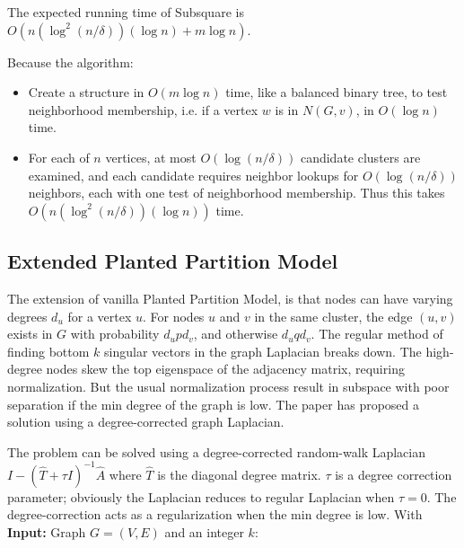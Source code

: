 {	\begin{theorem}
		The expected running time of Subsquare is $O(n(\log ^{2}(n / \delta))(\log n)+m \log n)$.
	\end{theorem}
	
	Because the algorithm:
	
	\begin{itemize}
		\item Create a structure in $O(m \log n)$ time, like a balanced binary tree, to test neighborhood membership, i.e. if a vertex $w$ is in $N(G,v)$, in $O(\log n)$ time.
		\item For each of $n$ vertices, at most $O(\log(n/\delta))$ candidate clusters are examined, and each candidate requires neighbor lookups for $O(\log(n/\delta))$ neighbors, each with one test of neighborhood membership. Thus this takes $O(n(\log ^{2}(n / \delta))(\log n))$ time.
	\end{itemize}
	
	\subsection{Extended Planted Partition Model}
	
	The extension of vanilla Planted Partition Model, is that nodes can have varying degrees $d_u$ for a vertex $u$. For nodes $u$ and $v$ in the same cluster, the edge $(u,v)$ exists in $G$ with probability $d_u p d_v$, and otherwise $d_u q d_v$. The regular method of finding bottom $k$ singular vectors in the graph Laplacian breaks down. The high-degree nodes skew the top eigenspace of the adjacency matrix, requiring normalization. But the usual normalization process result in subspace with poor separation if the min degree of the graph is low. The paper \cite{chau12} has proposed a solution using a degree-corrected graph Laplacian.
	
	The problem can be solved using a degree-corrected random-walk Laplacian $I-(\hat{T}+\tau I)^{-1} \hat{A}$ where $\hat{T}$ is the diagonal degree matrix. $\tau$ is a degree correction parameter; obviously the Laplacian reduces to regular Laplacian when $\tau=0$. The degree-correction acts as a regularization when the min degree is low. With \textbf{Input:} Graph $G = (V, E)$ and an integer $k$:
	
}
